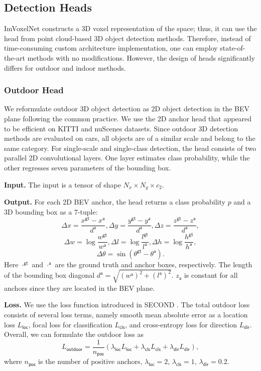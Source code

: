 \documentclass[10pt,twocolumn,letterpaper]{article}
\begin{document}
\subsection{Detection Heads}

ImVoxelNet constructs a 3D voxel representation of the space; thus, it can use the head from point cloud-based 3D object detection methods. Therefore, instead of time-consuming custom architecture implementation, one can employ state-of-the-art methods with no modifications. However, the design of heads significantly differs for outdoor \cite{lang2019pointpillars, yan2018second} and indoor \cite{qi2019votenet, qi2020imvotenet} methods.

\subsubsection{Outdoor Head} \label{sec:outdoor}

We reformulate outdoor 3D object detection as 2D object detection in the BEV plane following the common practice. We use the 2D anchor head that appeared to be efficient \cite{lang2019pointpillars, yan2018second} on KITTI \cite{geiger2012kitti} and nuScenes \cite{caesar2020nuscenes} datasets. Since outdoor 3D detection methods are evaluated on cars, all objects are of a similar scale and belong to the same category. For single-scale and single-class detection, the head consists of two parallel 2D convolutional layers. One layer estimates class probability, while the other regresses seven parameters of the bounding box.

\textbf{Input.} The input is a tensor of shape $N_x \times N_y \times c_2$.

\textbf{Output.} For each 2D BEV anchor, the head returns a class probability $p$ and a 3D bounding box as a 7-tuple:
\[\Delta x = \frac{x^\mathsf{gt}-x^\mathsf{a}}{d^\mathsf{a}}, \Delta y = \frac{y^\mathsf{gt}-y^\mathsf{a}}{d^\mathsf{a}}, \Delta z = \frac{z^\mathsf{gt}-z^\mathsf{a}}{d^\mathsf{a}},\]
\[\Delta w = \log \frac{w^\mathsf{gt}}{w^\mathsf{a}}, \Delta l = \log \frac{l^\mathsf{gt}}{l^\mathsf{a}}, \Delta h = \log \frac{h^\mathsf{gt}}{h^\mathsf{a}},\]
\[ \Delta \theta=\sin(\theta^\mathsf{gt}-\theta^\mathsf{a}).\]
Here $\cdot^\mathsf{gt}$ and $\cdot^\mathsf{a}$ are the ground truth and anchor boxes, respectively. The length of the bounding box diagonal $d^\mathsf{a}=\sqrt{{(w^\mathsf{a})}^2+{(l^\mathsf{a})}^2}$. $z_\mathsf{a}$ is constant for all anchors since they are located in the BEV plane.

\textbf{Loss.} We use the loss function introduced in SECOND \cite{yan2018second}. The total outdoor loss consists of several loss terms, namely smooth mean absolute error as a location loss $L_\mathsf{loc}$, focal loss for classification $L_\mathsf{cls}$, and cross-entropy loss for direction $L_\mathsf{dir}$. Overall, we can formulate the outdoor loss as \[L_\mathsf{outdoor}=\frac{1}{n_\mathsf{pos}}(\lambda_\mathsf{loc}L_\mathsf{loc} + \lambda_\mathsf{cls}L_\mathsf{cls} + \lambda_\mathsf{dir}L_\mathsf{dir}),\]
where $n_\mathsf{pos}$ is the number of positive anchors, $\lambda_\mathsf{loc}=2$, $\lambda_\mathsf{cls}=1$, $\lambda_\mathsf{dir}=0.2$.
\end{document}
